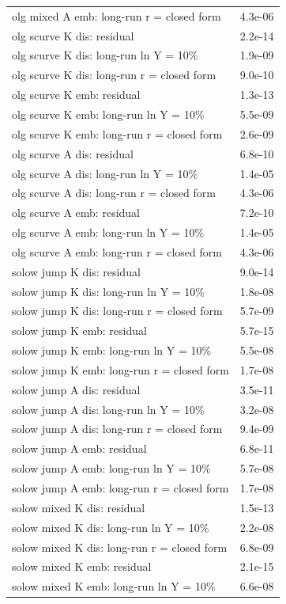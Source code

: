\begin{tabular}{lc}
olg mixed A emb: long-run r = closed form & 4.3e-06\\
olg scurve K dis: residual & 2.2e-14\\
olg scurve K dis: long-run ln Y = 10\% & 1.9e-09\\
olg scurve K dis: long-run r = closed form & 9.0e-10\\
olg scurve K emb: residual & 1.3e-13\\
olg scurve K emb: long-run ln Y = 10\% & 5.5e-09\\
olg scurve K emb: long-run r = closed form & 2.6e-09\\
olg scurve A dis: residual & 6.8e-10\\
olg scurve A dis: long-run ln Y = 10\% & 1.4e-05\\
olg scurve A dis: long-run r = closed form & 4.3e-06\\
olg scurve A emb: residual & 7.2e-10\\
olg scurve A emb: long-run ln Y = 10\% & 1.4e-05\\
olg scurve A emb: long-run r = closed form & 4.3e-06\\
solow jump K dis: residual & 9.0e-14\\
solow jump K dis: long-run ln Y = 10\% & 1.8e-08\\
solow jump K dis: long-run r = closed form & 5.7e-09\\
solow jump K emb: residual & 5.7e-15\\
solow jump K emb: long-run ln Y = 10\% & 5.5e-08\\
solow jump K emb: long-run r = closed form & 1.7e-08\\
solow jump A dis: residual & 3.5e-11\\
solow jump A dis: long-run ln Y = 10\% & 3.2e-08\\
solow jump A dis: long-run r = closed form & 9.4e-09\\
solow jump A emb: residual & 6.8e-11\\
solow jump A emb: long-run ln Y = 10\% & 5.7e-08\\
solow jump A emb: long-run r = closed form & 1.7e-08\\
solow mixed K dis: residual & 1.5e-13\\
solow mixed K dis: long-run ln Y = 10\% & 2.2e-08\\
solow mixed K dis: long-run r = closed form & 6.8e-09\\
solow mixed K emb: residual & 2.1e-15\\
solow mixed K emb: long-run ln Y = 10\% & 6.6e-08\\

\end{tabular}
